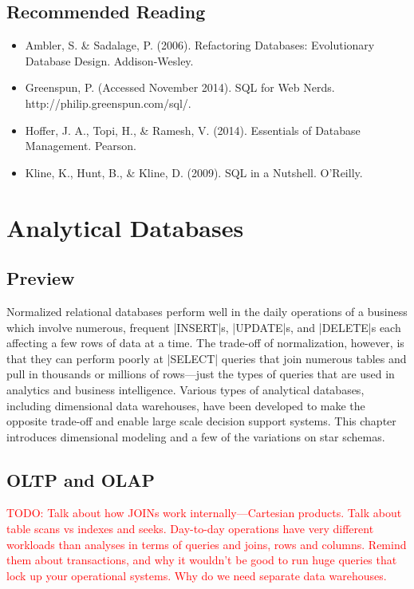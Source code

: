 \documentclass[11pt]{book}
\newcommand{\todo}[1]{\textcolor{red}{TODO: #1}} %
\begin{document}
\section*{Recommended Reading}
\begin{itemize}
    \item Ambler, S. \& Sadalage, P. (2006). Refactoring Databases: Evolutionary Database Design.  Addison-Wesley.
    \item Greenspun, P.  (Accessed November 2014). SQL for Web Nerds.\\ http://philip.greenspun.com/sql/.
    \item Hoffer, J. A., Topi, H., \& Ramesh, V. (2014). Essentials of Database Management.  Pearson.
    \item Kline, K., Hunt, B., \& Kline, D. (2009).  SQL in a Nutshell.  O'Reilly.
\end{itemize}









\chapter{Analytical Databases}\label{ch:olap}

\section*{Preview}

Normalized relational databases perform well in the daily operations of a business which involve numerous, frequent |INSERT|s, |UPDATE|s, and |DELETE|s each affecting a few rows of data at a time.  The trade-off of normalization, however, is that they can perform poorly at |SELECT| queries that join numerous tables and pull in thousands or millions of rows---just the types of queries that are used in analytics and business intelligence.  Various types of analytical databases, including dimensional data warehouses, have been developed to make the opposite trade-off and enable large scale decision support systems.  This chapter introduces dimensional modeling and a few of the variations on star schemas.


\section{OLTP and OLAP}
\todo{Talk about how JOINs work internally---Cartesian products.  Talk about table scans vs indexes and seeks.  Day-to-day operations have very different workloads than analyses in terms of queries and joins, rows and columns.  Remind them about transactions, and why it wouldn't be good to run huge queries that lock up your operational systems.  Why do we need separate data warehouses.}
\end{document}
